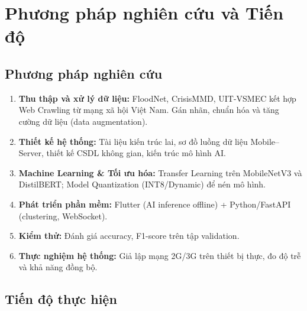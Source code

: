 \documentclass[12pt, a4paper]{report}
\begin{document}
\chapter{Phương pháp nghiên cứu và Tiến độ}

\section{Phương pháp nghiên cứu}

\begin{enumerate}
  \item \textbf{Thu thập và xử lý dữ liệu:} FloodNet, CrisisMMD, UIT-VSMEC kết hợp Web Crawling từ mạng xã hội Việt Nam. Gán nhãn, chuẩn hóa và tăng cường dữ liệu (data augmentation).

  \item \textbf{Thiết kế hệ thống:} Tài liệu kiến trúc lai, sơ đồ luồng dữ liệu Mobile–Server, thiết kế CSDL không gian, kiến trúc mô hình AI.

  \item \textbf{Machine Learning \& Tối ưu hóa:} Transfer Learning trên MobileNetV3 và DistilBERT; Model Quantization (INT8/Dynamic) để nén mô hình.

  \item \textbf{Phát triển phần mềm:} Flutter (AI inference offline) + Python/FastAPI (clustering, WebSocket).

  \item \textbf{Kiểm thử:} Đánh giá accuracy, F1-score trên tập validation.

  \item \textbf{Thực nghiệm hệ thống:} Giả lập mạng 2G/3G trên thiết bị thực, đo độ trễ và khả năng đồng bộ.
\end{enumerate}

\section{Tiến độ thực hiện}
\end{document}
